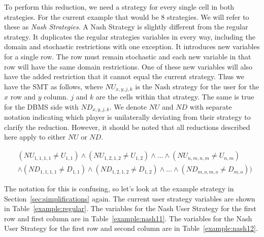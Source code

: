 \documentclass{article}
\begin{document}
To perform this reduction, we need a strategy for every single cell in both strategies. For the current example that would be 8 strategies. We will refer to these as \textit{Nash Strategies}. A Nash Strategy is slightly different from the regular strategy. It duplicates the regular strategies variables in every way, including the domain and stochastic restrictions with one exception. It introduces new variables for a single row. The row must remain stochastic and each new variable in that row will have the same domain restrictions. One of these new variables will also have the added restriction that it cannot equal the current strategy. Thus we have the SMT as follows, where $NU_{x,y,j,k}$ is the Nash strategy for the user for the $x$ row and $y$ column. $j$ and $k$ are the cells within that strategy. The same is true for the DBMS side with $ND_{x,y,j,k}$. We denote $NU$ and $ND$ with separate notation indicating which player is unilaterally deviating from their strategy to clarify the reduction. However, it should be noted that all reductions described here apply to either $NU$ or $ND$.

\begin{align}
\label{eqn:nasheq}
&(NU_{1,1,1,1} \ne U_{1,1}) \land (NU_{1,2,1,2} \ne U_{1,2})\land\ldots\land(NU_{n,m,n,m}\ne U_{n,m})\\
&\land(ND_{1,1,1,1} \ne D_{1,1}) \land (ND_{1,2,1,2} \ne D_{1,2})\land\ldots\land(ND_{m,o,m,o}\ne D_{m,o}))\nonumber
\end{align}

The notation for this is confusing, so let's look at the example strategy in Section~\ref{sec:simplifications} again. The current user strategy variables are shown in Table~\ref{example:regular}. The variables for the Nash User Strategy for the first row and first column are in Table~\ref{example:nash11}. The variables for the Nash User Strategy for the first row and second column are in Table~\ref{example:nash12}.
\end{document}
